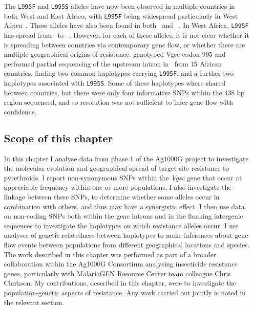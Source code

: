 \documentclass[a4paper,11pt,abstracton,hidelinks]{scrartcl}
\begin{document}
The \texttt{L995F} and \texttt{L995S} alleles have now been observed in multiple countries in both West and East Africa, with \texttt{L995F} being widespread particularly in West Africa~\parencite{WHO2018GRIR}.
%
These alleles have also been found in both \agam\ and \acol~\parencite{Clarkson2014,Norris2015,Djouaka2018}.
%
In West Africa, \texttt{L995F} has spread from \agam\ to \acol~\parencite{Clarkson2014,Norris2015}.
%
However, for each of these alleles, it is not clear whether it is spreading between countries via contemporary gene flow, or whether there are multiple geographical origins of resistance.
%
\textcite{Pinto2007} genotyped Vgsc codon 995 and performed partial sequencing of the upstream intron in \agam\ from 15 African countries, finding two common haplotypes carrying \texttt{L995F}, and a further two haplotypes associated with \texttt{L995S}.
%
Some of these haplotypes where shared between countries, but there were only four informative SNPs within the 438 bp region sequenced, and so resolution was not sufficient to infer gene flow with confidence.


\subsection{Scope of this chapter}\label{subsec:intro-scope}


In this chapter I analyse data from phase 1 of the Ag1000G project to investigate the molecular evolution and geographical spread of target-site resistance to pyrethroids.
%
I report non-synonymous SNPs within the \textit{Vgsc} gene that occur at appreciable frequency within one or more populations.
%
I also investigate the linkage between these SNPs, to determine whether some alleles occur in combination with others, and thus may have a synergistic effect.
%
I then use data on non-coding SNPs both within the gene introns and in the flanking intergenic sequences to investigate the haplotypes on which resistance alleles occur.
%
I use analyses of genetic relatedness between haplotypes to make inferences about gene flow events between populations from different geographical locations and species.
%
The work described in this chapter was performed as part of a broader collaboration within the Ag1000G Consortium analysing insecticide resistance genes, particularly with MalariaGEN Resource Center team colleague Chris Clarkson.
%
My contributions, described in this chapter, were to investigate the population-genetic aspects of resistance.
%
Any work carried out jointly is noted in the relevant section.
\end{document}
